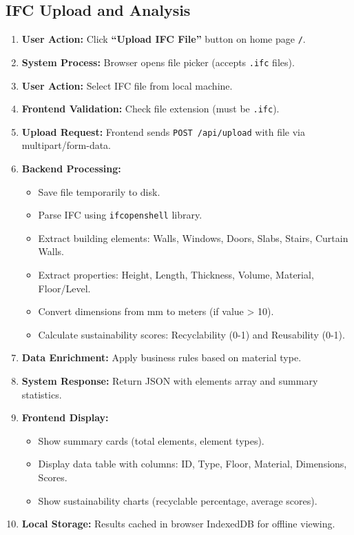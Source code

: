 \documentclass[11pt,a4paper]{article}
\begin{document}
\subsection{IFC Upload and Analysis}

\begin{enumerate}[leftmargin=*]
    \item \textbf{User Action:} Click \textbf{``Upload IFC File''} button on home page \texttt{/}.
    \item \textbf{System Process:} Browser opens file picker (accepts \texttt{.ifc} files).
    \item \textbf{User Action:} Select IFC file from local machine.
    \item \textbf{Frontend Validation:} Check file extension (must be \texttt{.ifc}).
    \item \textbf{Upload Request:} Frontend sends \texttt{POST /api/upload} with file via multipart/form-data.
    \item \textbf{Backend Processing:}
        \begin{itemize}
            \item Save file temporarily to disk.
            \item Parse IFC using \texttt{ifcopenshell} library.
            \item Extract building elements: Walls, Windows, Doors, Slabs, Stairs, Curtain Walls.
            \item Extract properties: Height, Length, Thickness, Volume, Material, Floor/Level.
            \item Convert dimensions from mm to meters (if value > 10).
            \item Calculate sustainability scores: Recyclability (0-1) and Reusability (0-1).
        \end{itemize}
    \item \textbf{Data Enrichment:} Apply business rules based on material type.
    \item \textbf{System Response:} Return JSON with elements array and summary statistics.
    \item \textbf{Frontend Display:}
        \begin{itemize}
            \item Show summary cards (total elements, element types).
            \item Display data table with columns: ID, Type, Floor, Material, Dimensions, Scores.
            \item Show sustainability charts (recyclable percentage, average scores).
        \end{itemize}
    \item \textbf{Local Storage:} Results cached in browser IndexedDB for offline viewing.
\end{enumerate}
\end{document}

